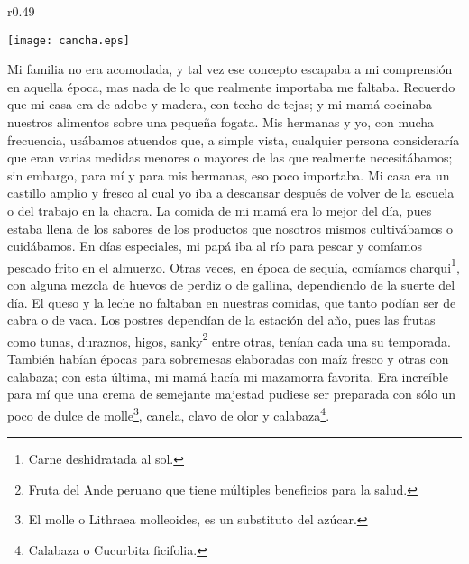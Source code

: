 \ifdefined\EnableIncludeImages
\begin{wrapfigure}{r}{0.49\textwidth}
  \begin{center}
  \vspace{-20pt}
    \texttt{[image: cancha.eps]}
  \end{center}
  \vspace{-20pt}
\end{wrapfigure}
\fi
Mi familia no era acomodada, y tal vez ese concepto escapaba a mi comprensión en aquella época, mas nada de lo que realmente importaba me faltaba.   
Recuerdo que mi casa era de adobe y madera, con techo de tejas; y mi mamá cocinaba nuestros alimentos sobre una pequeña fogata. Mis hermanas y yo, con mucha frecuencia, usábamos atuendos que, a simple vista, cualquier persona consideraría que eran varias medidas menores o mayores de las que realmente necesitábamos;
sin embargo, para mí y para mis hermanas, eso poco importaba. Mi casa era un castillo amplio y fresco al cual yo iba a descansar después de volver de la escuela o del trabajo en la chacra.
La comida de mi mamá era lo mejor del día, pues estaba llena de los sabores de los productos que nosotros mismos cultivábamos o cuidábamos. 
En días especiales, mi papá iba al río para pescar y comíamos pescado frito en el almuerzo. Otras veces, en época de sequía, comíamos charqui\footnote{Carne deshidratada al sol.}, con alguna mezcla de huevos de perdiz o de gallina, dependiendo de la suerte del día.
El queso y la leche no faltaban en nuestras comidas, que tanto podían ser de cabra o de vaca.
Los postres dependían de la estación del año, pues las frutas como tunas, duraznos, higos, sanky\footnote{Fruta del Ande peruano que tiene múltiples beneficios para la salud.} entre otras, tenían cada una su temporada. También habían épocas para sobremesas elaboradas con maíz fresco y otras con calabaza; con esta última, mi mamá hacía mi mazamorra favorita. Era increíble para mí que una crema de semejante majestad pudiese ser preparada con sólo un poco de dulce de molle\footnote{El molle o Lithraea molleoides, es un substituto del azúcar.}, canela, clavo de olor y calabaza\footnote{Calabaza o Cucurbita ficifolia.}.

